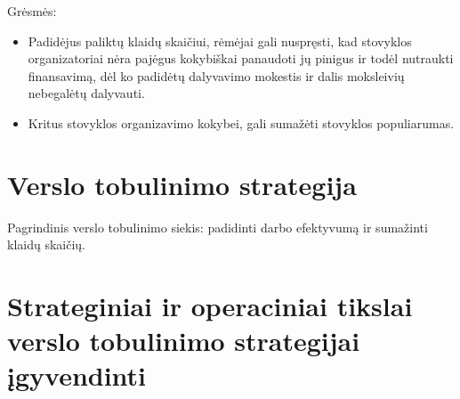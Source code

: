 Grėsmės:
\begin{itemize}
  \item Padidėjus paliktų klaidų skaičiui, rėmėjai gali nuspręsti, kad 
    stovyklos organizatoriai nėra pajėgus kokybiškai panaudoti jų pinigus
    ir todėl nutraukti finansavimą, dėl ko padidėtų dalyvavimo mokestis ir
    dalis moksleivių nebegalėtų dalyvauti.
  \item Kritus stovyklos organizavimo kokybei, gali sumažėti stovyklos
    populiarumas.
\end{itemize}

\section{Verslo tobulinimo strategija}

Pagrindinis verslo tobulinimo siekis: padidinti darbo efektyvumą ir 
sumažinti klaidų skaičių.

\section{Strateginiai ir operaciniai tikslai verslo tobulinimo %
  strategijai įgyvendinti}

